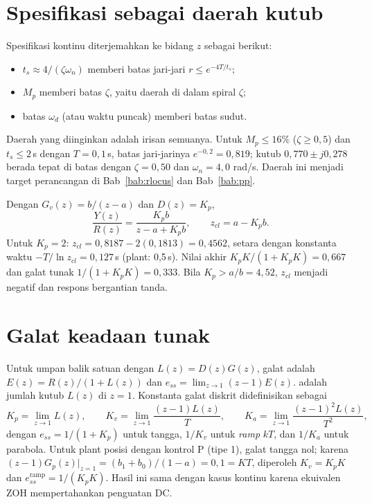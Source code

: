 \section{Spesifikasi sebagai daerah kutub}
Spesifikasi kontinu diterjemahkan ke bidang $z$ sebagai berikut:
\begin{itemize}
	\item $t_s \approx 4/(\zeta\omega_n)$ memberi batas jari-jari $r \le e^{-4T/t_s}$;
	\item $M_p$ memberi batas $\zeta$, yaitu daerah di dalam spiral $\zeta$;
	\item batas $\omega_d$ (atau waktu puncak) memberi batas sudut.
\end{itemize}
Daerah yang diinginkan adalah irisan semuanya. Untuk $M_p \le 16\%$ ($\zeta \ge 0{,}5$) dan $t_s \le 2$\,s dengan $T = 0{,}1$\,s, batas jari-jarinya $e^{-0{,}2} = 0{,}819$; kutub $0{,}770 \pm j0{,}278$ berada tepat di batas dengan $\zeta = 0{,}50$ dan $\omega_n = 4{,}0$ rad/s. Daerah ini menjadi target perancangan di Bab~\ref{bab:rlocus} dan Bab~\ref{bab:pp}.

\begin{contoh}
	Dengan $G_v(z) = b/(z-a)$ dan $D(z) = K_p$,
	\[
		\frac{Y(z)}{R(z)} = \frac{K_pb}{z - a + K_pb},\qquad z_{cl} = a - K_pb.
	\]
	Untuk $K_p = 2$: $z_{cl} = 0{,}8187 - 2(0{,}1813) = 0{,}4562$, setara dengan konstanta waktu $-T/\ln z_{cl} = 0{,}127$\,s (plant: 0,5\,s). Nilai akhir $K_pK/(1+K_pK) = 0{,}667$ dan galat tunak $1/(1+K_pK) = 0{,}333$. Bila $K_p > a/b = 4{,}52$, $z_{cl}$ menjadi negatif dan respons bergantian tanda.
\end{contoh}

\section{Galat keadaan tunak}
Untuk umpan balik satuan dengan $L(z) = D(z)G(z)$, galat adalah $E(z) = R(z)/(1+L(z))$ dan $e_{ss} = \lim_{z\to1}(z-1)E(z)$.  adalah jumlah kutub $L(z)$ di $z = 1$. Konstanta galat diskrit didefinisikan sebagai
\begin{equation}
	K_p = \lim_{z\to1}L(z),\qquad K_v = \lim_{z\to1}\frac{(z-1)L(z)}{T},\qquad K_a = \lim_{z\to1}\frac{(z-1)^2L(z)}{T^2},
\end{equation}
dengan $e_{ss} = 1/(1+K_p)$ untuk tangga, $1/K_v$ untuk \textit{ramp} $kT$, dan $1/K_a$ untuk parabola. Untuk plant posisi dengan kontrol P (tipe 1), galat tangga nol; karena $(z-1)G_p(z)|_{z=1} = (b_1+b_0)/(1-a) = 0{,}1 = KT$, diperoleh $K_v = K_pK$ dan $e_{ss}^{\text{ramp}} = 1/(K_pK)$. Hasil ini sama dengan kasus kontinu karena ekuivalen ZOH mempertahankan penguatan DC.

